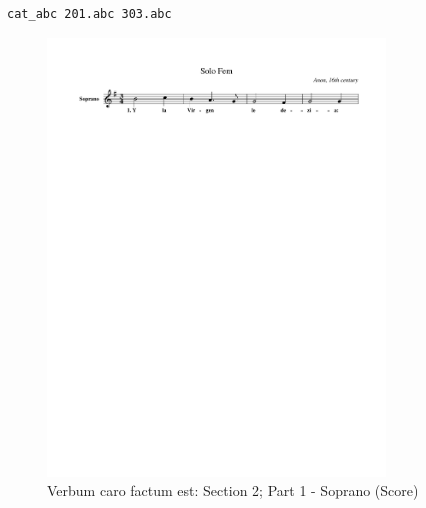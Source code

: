 \begin{lstlisting}[caption={\catabc{} by example},label={lst:cat_abc_by_example},captionpos=t,abovecaptionskip=-\medskipamount]
cat_abc 201.abc 303.abc
\end{lstlisting}



\vspace{-1.30cm}
\begin{figure}[h]
  \begin{center}
    \includegraphics[width=0.8\textwidth, clip=true, trim = 15mm 231mm 0mm 0mm]{img/201.pdf}
    \caption{Verbum caro factum est: Section 2; Part 1 - Soprano (Score)}
  \end{center}
\end{figure}



